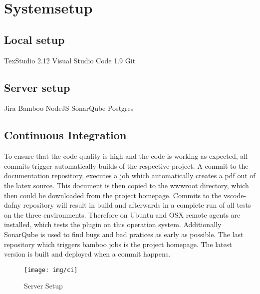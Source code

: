 \section{Systemsetup}
\subsection{Local setup}
TexStudio 2.12\newline
Visual Studio Code 1.9\newline
Git 


\subsection{Server setup}
Jira \newline
Bamboo\newline
NodeJS\newline
SonarQube\newline
Postgres


\subsection{Continuous Integration}

To ensure that the code quality is high and the code is working as expected, all commits trigger automatically builds of the respective project. A commit to the documentation repository, executes a job which automatically creates a pdf out of the latex source. This document is then copied to the wwwroot directory, which then could be downloaded from the project homepage. Commits to the vscode-dafny repository will result in build and afterwards in a complete run of all tests on the three environments. Therefore on Ubuntu and OSX remote agents are installed, which tests the plugin on this operation system.  Additionally SonarQube is used to find bugs and bad pratices as early as possible. The last repository which triggers bamboo jobs is the project homepage. The latest version is built and deployed when a commit happens. 


\begin{figure}[H]
	\centering
	\texttt{[image: img/ci]}
	\caption{Server Setup}
	\label{fig:Server setup}
\end{figure}